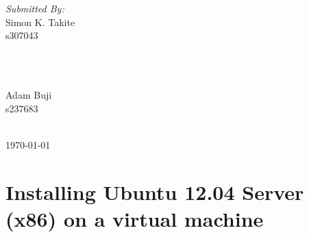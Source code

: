\documentclass[12pt]{article}
\begin{document}
\begin{titlepage}
\begin{minipage}{0.4\textwidth}
\begin{flushleft} \large
\emph{Submitted By:}\\
Simon K. Takite \\s307043 %
\end{flushleft}
\end{minipage}
~
\begin{minipage}{0.4\textwidth}
\begin{flushright} \large
\emph{}\\
Adam Buji \\s237683 %
\end{flushright}
\end{minipage}\\[1cm]


{\large \today }\\[1cm] %

\vfill %

\end{titlepage}



\section{Installing Ubuntu 12.04 Server (x86) on a virtual machine}
\end{document}
